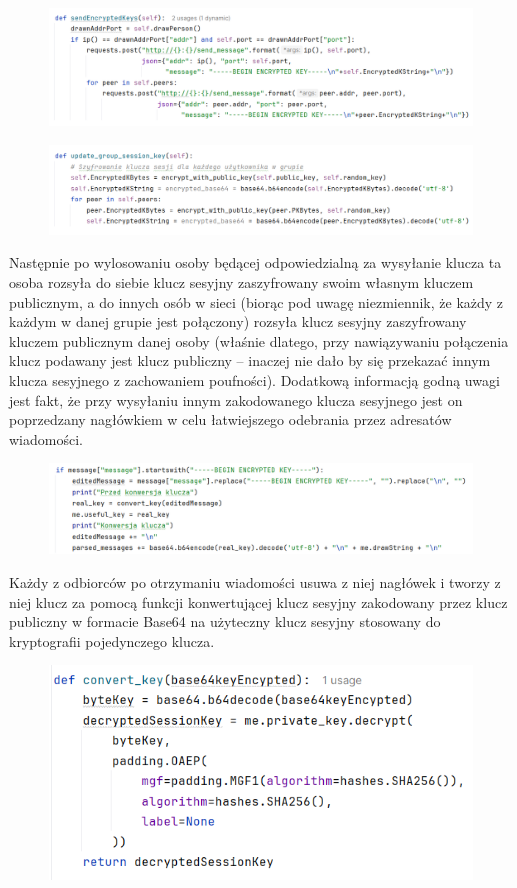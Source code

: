 \begin{figure}[H]
    \centering
    \includegraphics[width=\textwidth]{Images/CodeX16.png}
\end{figure}
\begin{figure}[H]
    \centering
    \includegraphics[width=\textwidth]{Images/CodeX17.png}
\end{figure}
Następnie po wylosowaniu osoby będącej odpowiedzialną za wysyłanie klucza ta osoba rozsyła do siebie klucz sesyjny zaszyfrowany swoim własnym kluczem publicznym, a do innych osób w sieci (biorąc pod uwagę niezmiennik, że każdy z każdym w danej grupie jest połączony) rozsyła klucz sesyjny zaszyfrowany kluczem publicznym danej osoby (właśnie dlatego, przy nawiązywaniu połączenia klucz podawany jest klucz publiczny – inaczej nie dało by się przekazać innym klucza sesyjnego z zachowaniem poufności). Dodatkową informacją godną uwagi jest fakt, że przy wysyłaniu innym zakodowanego klucza sesyjnego jest on poprzedzany nagłówkiem w celu łatwiejszego odebrania przez adresatów wiadomości.
\begin{figure}[H]
    \centering
    \includegraphics[width=\textwidth]{Images/CodeX18.png}
\end{figure}
Każdy z odbiorców po otrzymaniu wiadomości usuwa z niej nagłówek i tworzy z niej klucz za pomocą funkcji konwertującej klucz sesyjny zakodowany przez klucz publiczny w formacie Base64 na użyteczny klucz sesyjny stosowany do kryptografii pojedynczego klucza.
\begin{figure}[H]
    \centering
    \includegraphics[width=\textwidth]{Images/CodeX19.png}
\end{figure}
